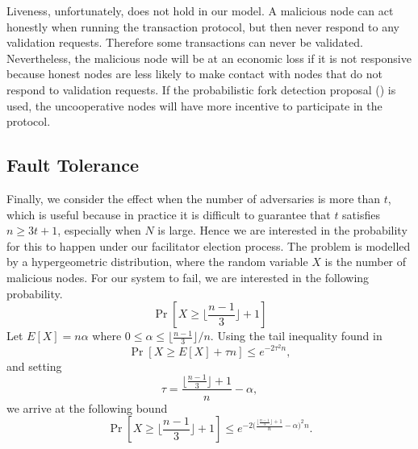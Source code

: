 Liveness, unfortunately, does not hold in our model.
A malicious node can act honestly when running the transaction protocol,
but then never respond to any validation requests.
Therefore some transactions can never be validated.
Nevertheless, the malicious node will be at an economic loss if it is not responsive because honest nodes are less likely to make contact with nodes that do not respond to validation requests.
If the probabilistic fork detection proposal () is used,
the uncooperative nodes will have more incentive to participate in the protocol.


\subsection{Fault Tolerance}
Finally, we consider the effect when the number of adversaries is more than $t$,
which is useful because in practice it is difficult to guarantee that $t$ satisfies $n \ge 3t + 1$,
especially when $N$ is large.
Hence we are interested in the probability for this to happen under our facilitator election process.
The problem is modelled by a hypergeometric distribution,
where the random variable $X$ is the number of malicious nodes.
For our system to fail, we are interested in the following probability.
$$
\Pr[X \ge \lfloor \frac{n-1}{3} \rfloor + 1]
$$
Let $E[X] = n\alpha$ where $0 \le \alpha \le \lfloor \frac{n-1}{3} \rfloor/n$.
Using the tail inequality found in~\cite{skala2013hypergeometric}
$$
\Pr[X \ge E[X] + \tau n] \le e^{-2\tau^2n},
$$
and setting 
$$
\tau = \frac{\lfloor \frac{n-1}{3} \rfloor + 1}{n} - \alpha,
$$
we arrive at the following bound
$$
\Pr[X \ge \lfloor \frac{n-1}{3} \rfloor + 1] \le e^{-2 \big(\frac{\lfloor  \frac{n - 1}{3} \rfloor + 1}{n} - \alpha \big)^2 n}.
$$

